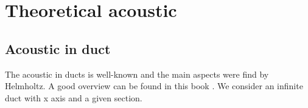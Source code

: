 \section{Theoretical acoustic}\label{sec:section2}
\subsection{Acoustic in duct}
The acoustic in ducts is well-known and the main aspects were find by Helmholtz. A good overview can be found in this book \cite{Luck_thesis}.
We consider an infinite duct with x axis and a given section.

